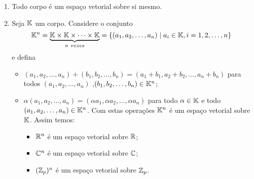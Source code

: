 \begin{exemplo}
	\begin{enumerate}
		\item Todo corpo \'e um espa\c{c}o vetorial sobre si mesmo.
		\item Seja $\mathbb{K}$ um corpo. Considere o conjunto
		\[
			\mathbb{K}^n = \underbrace{\mathbb{K} \times \mathbb{K} \times \cdots \times \mathbb{K}}_{n\ vezes} = \{(a_1, a_2,\dots,a_n) \mid a_i \in \mathbb{K}, i =1, 2, \dots, n\}
		\]
		e defina
		\begin{itemize}
			\item $(a_1, a_2, \dots, a_n) + (b_1, b_2, \dots,b_n) = (a_1 + b_1, a_2 + b_2,\dots, a_n + b_n)$ para todos $(a_1, a_2, \dots,a_n)$ ,$(b_1, b_2, \dots,b_n) \in \mathbb{K}^n$;
			\item $\alpha (a_1, a_2, \dots,a_n) = (\alpha a_1, \alpha a_2, \dots, \alpha a_n)$ para todo $\alpha \in \mathbb{K}$ e todo $(a_1, a_2, \dots, a_n) \in \mathbb{K}^n$.
			Com estas opera\c{c}\~oes $\mathbb{K}^n$ \'e um espa\c{c}o vetorial sobre $\mathbb{K}$. Assim temos:
			\begin{itemize}
				\item $\mathbb{R}^n$ \'e um espa\c{c}o vetorial sobre $\mathbb{R}$;
				\item $\mathbb{C}^n$ \'e um espa\c{c}o vetorial sobre $\mathbb{C}$;
				\item $(\mathbb{Z}_p)^n$ \'e um espa\c{c}o vetorial sobre $\mathbb{Z}_p$.
			\end{itemize}


\end{itemize}
\end{enumerate}
\end{exemplo}
